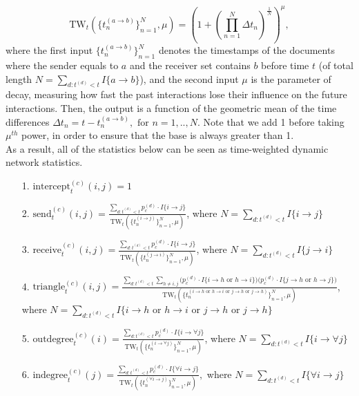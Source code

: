 \documentclass[a4paper]{article}
\begin{document}
 \begin{equation}
\mbox{TW}_t(\{t_n^{(a\rightarrow b)}\}_{n=1}^N, \mu) = (1+(\prod\limits_{n=1}^N\Delta t_n)^{\frac{1}{N}})^\mu,
 \end{equation}
 where the first input $\{t_n^{(a\rightarrow b)}\}_{n=1}^N$ denotes the timestamps of the documents where the sender equals to $a$ and the receiver set contains $b$ before time $t$ (of total length $N = \sum_{d: t^{(d)}<t} I\{a\rightarrow b\}$), and the second input $\mu$ is the parameter of decay, measuring how fast the past interactions lose their influence on the future interactions. Then, the output is a function of the geometric mean of the time differences $\Delta t_n=t-t_n^{(a\rightarrow b)}, \mbox{ for } n=1,..,N$. Note that we add 1 before taking $\mu^{th}$ power, in order to ensure that the base is always greater than 1.\\ \newline
 As a result, all of the statistics below can be seen as time-weighted dynamic network statistics.
 \begin{itemize}[leftmargin=*,rightmargin=-1cm]
 	\item [1.] $\mbox{intercept}^{(c)}_t(i, j) = 1$
 	\item [2.]  $\mbox{send}^{(c)}_t(i, j)= \frac{\sum\limits_{d: t^{(d)}<t}p_c^{(d)}\cdot I\{i\rightarrow j\}}{\mbox{TW}_t(\{t_n^{(i\rightarrow j)}\}_{n=1}^N, \mu) }$, where $N = \sum\limits_{d: t^{(d)}<t} I\{i\rightarrow j\}$
 	\item [3.] $\mbox{receive}^{(c)}_t(i, j)=\frac{\sum\limits_{d: t^{(d)}<t}p_c^{(d)}\cdot I\{i\rightarrow j\}}{\mbox{TW}_t(\{t_n^{(j\rightarrow i)}\}_{n=1}^N, \mu) }$, where $N = \sum\limits_{d: t^{(d)}<t} I\{j\rightarrow i\}$
 	\item [4.] $\mbox{triangle}^{(c)}_t(i, j)=\frac{\sum\limits_{d: t^{(d)}<t}\sum\limits_{h \neq i, j}\Big(p_c^{(d)}\cdot I\{i\rightarrow h \mbox{ or } h\rightarrow i\}\Big)\Big(p_c^{(d)}\cdot I\{j\rightarrow h \mbox{ or } h\rightarrow j\}\Big)}{\mbox{TW}_t(\{t_n^{(i\rightarrow h \mbox{ or } h\rightarrow i \mbox{ or } j\rightarrow h \mbox{ or } j\rightarrow h)}\}_{n=1}^N, \mu) }$, \\where $N = \sum\limits_{d: t^{(d)}<t} I\{i\rightarrow h \mbox{ or } h\rightarrow i \mbox{ or } j\rightarrow h \mbox{ or } j\rightarrow h\}$
 	\item [5.]  $\mbox{outdegree}^{(c)}_t(i)=\frac{\sum\limits_{d: t^{(d)}<t}p_c^{(d)}\cdot I\{i\rightarrow \forall j\}}{\mbox{TW}_t(\{t_n^{(i\rightarrow \forall j)}\}_{n=1}^N, \mu) }$, where $N = \sum\limits_{d: t^{(d)}<t} I\{i\rightarrow \forall j\}$
 	\item [6.] $\mbox{indegree}^{(c)}_t(j)=\frac{\sum\limits_{d: t^{(d)}<t}p_c^{(d)}\cdot I\{\forall i\rightarrow j\}}{\mbox{TW}_t(\{t_n^{(\forall i\rightarrow  j)}\}_{n=1}^N, \mu)}, $ where $N = \sum\limits_{d: t^{(d)}<t} I\{\forall i\rightarrow j\}$
 \end{itemize}
\end{document}
